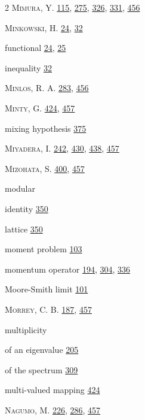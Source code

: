 \begin{multicols}{2}
\noindent \textsc{Mimura}, Y. \hyperlink{page.115}{115}, \hyperlink{page.275}{275}, \hyperlink{page.326}{326}, \hyperlink{page.331}{331}, \hyperlink{page.456}{456}\par
\noindent \textsc{Minkowski}, H. \hyperlink{page.24}{24}, \hyperlink{page.32}{32}\par
\hspace*{1.1em}functional \hyperlink{page.24}{24}, \hyperlink{page.25}{25}\par
\hspace*{1.1em}inequality \hyperlink{page.32}{32}\par
\noindent \textsc{Minlos}, R. A. \hyperlink{page.283}{283}, \hyperlink{page.456}{456}\par
\noindent \textsc{Minty}, G. \hyperlink{page.424}{424}, \hyperlink{page.457}{457}\par
\noindent mixing hypothesis \hyperlink{page.375}{375}\par
\noindent \textsc{Miyadera}, I. \hyperlink{page.242}{242}, \hyperlink{page.430}{430}, \hyperlink{page.438}{438}, \hyperlink{page.457}{457}\par
\noindent \textsc{Mizohata}, S. \hyperlink{page.400}{400}, \hyperlink{page.457}{457}\par
\noindent modular\par
\hspace*{1.1em}identity \hyperlink{page.350}{350}\par
\hspace*{1.1em}lattice \hyperlink{page.350}{350}\par
\noindent moment problem \hyperlink{page.103}{103}\par
\noindent momentum operator \hyperlink{page.194}{194}, \hyperlink{page.304}{304}, \hyperlink{page.336}{336}\par
\noindent Moore-Smith limit \hyperlink{page.101}{101}\par
\noindent \textsc{Morrey}, C. B. \hyperlink{page.187}{187}, \hyperlink{page.457}{457}\par
\noindent multiplicity\par
\hspace*{1.1em}of an eigenvalue \hyperlink{page.205}{205}\par
\hspace*{1.1em}of the spectrum \hyperlink{page.309}{309}\par
\noindent multi-valued mapping \hyperlink{page.424}{424}\par
\noindent \textsc{Nagumo}, M. \hyperlink{page.226}{226}, \hyperlink{page.286}{286}, \hyperlink{page.457}{457}\par

\end{multicols}
